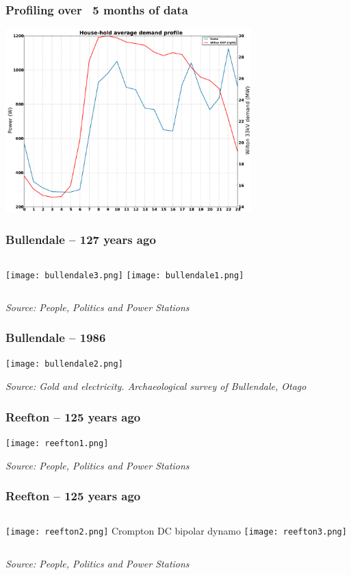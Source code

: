 \documentclass[aspectratio=169]{beamer}
\begin{document}
\frame
{\frametitle{Profiling over ~5 months of data}
\begin{center}
\includegraphics[width=9.5cm]{./notebooks/125_years_of_data_files/125_years_of_data_fig_05.pdf} 
\end{center}
}
\frame
{\frametitle{Bullendale -- 127 years ago}
\begin{columns}[t]
  \column[T]{3cm}
      \texttt{[image: bullendale3.png]} 
  \column[T]{7cm}
  \vspace{5mm}
  \texttt{[image: bullendale1.png]} 
\end{columns}
\begin{flushright}
\tiny \emph{Source: People, Politics and Power Stations}
\end{flushright}

}

\frame
{\frametitle{Bullendale -- 1986}
\begin{center}
\texttt{[image: bullendale2.png]} 
\end{center}
\begin{flushright}
\tiny \emph{Source: Gold and electricity. Archaeological survey of Bullendale, Otago
}
\end{flushright}

}


\frame
{\frametitle{Reefton -- 125 years ago}
\begin{center}
\texttt{[image: reefton1.png]} 
\end{center}
\begin{flushright}
\tiny \emph{Source: People, Politics and Power Stations}
\end{flushright}

}

\frame
{\frametitle{Reefton -- 125 years ago}
\begin{columns}[t]
  \column[T]{6cm}
   \texttt{[image: reefton2.png]} 
  \column[T]{4cm}
  \vspace{5mm}
  \small Crompton DC bipolar dynamo
   \texttt{[image: reefton3.png]} 
\end{columns}
\begin{flushright}
\tiny \emph{Source: People, Politics and Power Stations}
\end{flushright}

}
\end{document}
